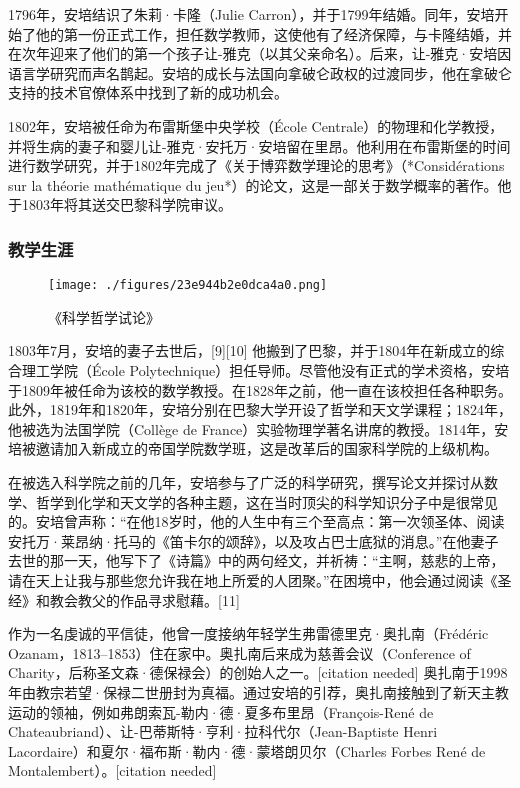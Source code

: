 1796年，安培结识了朱莉·卡隆（Julie Carron），并于1799年结婚。同年，安培开始了他的第一份正式工作，担任数学教师，这使他有了经济保障，与卡隆结婚，并在次年迎来了他们的第一个孩子让-雅克（以其父亲命名）。后来，让-雅克·安培因语言学研究而声名鹊起。安培的成长与法国向拿破仑政权的过渡同步，他在拿破仑支持的技术官僚体系中找到了新的成功机会。

1802年，安培被任命为布雷斯堡中央学校（École Centrale）的物理和化学教授，并将生病的妻子和婴儿让-雅克·安托万·安培留在里昂。他利用在布雷斯堡的时间进行数学研究，并于1802年完成了《关于博弈数学理论的思考》（*Considérations sur la théorie mathématique du jeu*）的论文，这是一部关于数学概率的著作。他于1803年将其送交巴黎科学院审议。
\subsubsection{教学生涯}
\begin{figure}[ht]
\centering
\texttt{[image: ./figures/23e944b2e0dca4a0.png]}
\caption{《科学哲学试论》} \label{fig_AP_1}
\end{figure}
1803年7月，安培的妻子去世后，[9][10] 他搬到了巴黎，并于1804年在新成立的综合理工学院（École Polytechnique）担任导师。尽管他没有正式的学术资格，安培于1809年被任命为该校的数学教授。在1828年之前，他一直在该校担任各种职务。此外，1819年和1820年，安培分别在巴黎大学开设了哲学和天文学课程；1824年，他被选为法国学院（Collège de France）实验物理学著名讲席的教授。1814年，安培被邀请加入新成立的帝国学院数学班，这是改革后的国家科学院的上级机构。

在被选入科学院之前的几年，安培参与了广泛的科学研究，撰写论文并探讨从数学、哲学到化学和天文学的各种主题，这在当时顶尖的科学知识分子中是很常见的。安培曾声称：“在他18岁时，他的人生中有三个至高点：第一次领圣体、阅读安托万·莱昂纳·托马的《笛卡尔的颂辞》，以及攻占巴士底狱的消息。”在他妻子去世的那一天，他写下了《诗篇》中的两句经文，并祈祷：“主啊，慈悲的上帝，请在天上让我与那些您允许我在地上所爱的人团聚。”在困境中，他会通过阅读《圣经》和教会教父的作品寻求慰藉。[11]

作为一名虔诚的平信徒，他曾一度接纳年轻学生弗雷德里克·奥扎南（Frédéric Ozanam，1813–1853）住在家中。奥扎南后来成为慈善会议（Conference of Charity，后称圣文森·德保禄会）的创始人之一。[citation needed] 奥扎南于1998年由教宗若望·保禄二世册封为真福。通过安培的引荐，奥扎南接触到了新天主教运动的领袖，例如弗朗索瓦-勒内·德·夏多布里昂（François-René de Chateaubriand）、让-巴蒂斯特·亨利·拉科代尔（Jean-Baptiste Henri Lacordaire）和夏尔·福布斯·勒内·德·蒙塔朗贝尔（Charles Forbes René de Montalembert）。[citation needed]